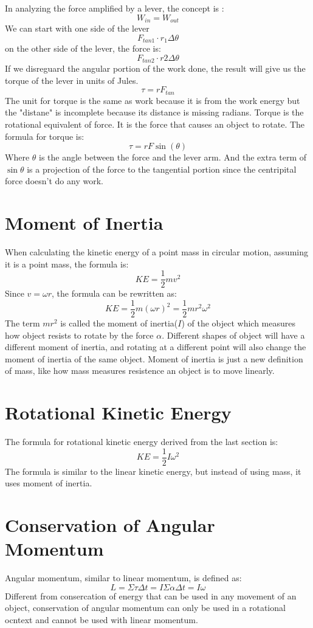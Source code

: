 \documentclass[]{article}
\begin{document}
        In analyzing the force amplified by a lever, the concept is :
        \[W_{in} = W_{out}\]
        We can start with one side of the lever
        \[F_{tan1} \cdot r_{1}\Delta \theta\]
        on the other side of the lever, the force is:
        \[F_{tan2}\cdot r{2}\Delta \theta\]
        If we disreguard the angular portion of the work done, the result
        will give us the torque of the lever in units of Jules.
        \[\tau = r F_{tan}\]
        The unit for torque is the same as work because it is from the work
        energy but the "distane" is incomplete because its distance is
        missing radians.
        Torque is the rotational equivalent of force. It is the force that
        causes an object to rotate. The formula for torque is:
        \[\tau = r F \sin(\theta)\]
        Where $\theta$ is the angle between the force and the lever arm. And
    the extra term of $\sin \theta$ is a projection of the force to the
    tangential portion since the centripital force doesn't do any work.
    \section{Moment of Inertia}
    When calculating the kinetic energy of a point mass in circular motion,
    assuming it is a point mass, the formula is:
        \[KE = \frac{1}{2}mv^2\]
    Since $v = \omega r$, the formula can be rewritten as:
        \[KE = \frac{1}{2}m(\omega r)^2 = \frac{1}{2}m r^2 \omega^2\]
    The term $mr^2$ is called the moment of inertia($I$) of the object which
    measures how object resists to rotate by the force $\alpha$. Different
    shapes of object will have a different moment of inertia, and rotating
    at a different point will also change the moment of inertia of the same
    object. Moment of inertia is just a new definition of mass, like how
    mass measures resistence an object is to move linearly.
    \section{Rotational Kinetic Energy}
    The formula for rotational kinetic energy derived from the last section is:
        \[KE = \frac{1}{2} I \omega^2\]
    The formula is similar to the linear kinetic energy, but instead of using
    mass, it uses moment of inertia.
    \section{Conservation of Angular Momentum}
    Angular momentum, similar to linear momentum, is defined as:
        \[L = \Sigma \tau \Delta t  = I \Sigma \alpha \Delta t = I\omega\]
    Different from consercation of energy that can be used in any movement of an object,
    conservation of angular momentum can only be used in a rotational
    ocntext and cannot be used with linear momentum.
\end{document}
